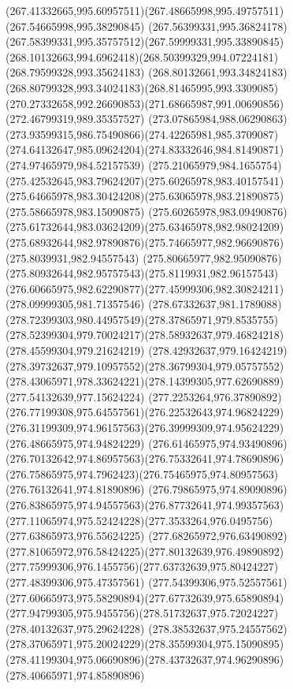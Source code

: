 {{		\curveto(267.41332665,995.60957511)(267.48665998,995.49757511)(267.54665998,995.38290845)
		\curveto(267.56399331,995.36824178)(267.58399331,995.35757512)(267.59999331,995.33890845)
		\curveto(268.10132663,994.6962418)(268.50399329,994.07224181)(268.79599328,993.35624183)
		\curveto(268.80132661,993.34824183)(268.80799328,993.34024183)(268.81465995,993.3309085)
		\curveto(270.27332658,992.26690853)(271.68665987,991.00690856)(272.46799319,989.35357527)
		\curveto(273.07865984,988.06290863)(273.93599315,986.75490866)(274.42265981,985.3709087)
		\curveto(274.64132647,985.09624204)(274.83332646,984.81490871)(274.97465979,984.52157539)
		\curveto(275.21065979,984.1655754)(275.42532645,983.79624207)(275.60265978,983.40157541)
		\curveto(275.64665978,983.30424208)(275.63065978,983.21890875)(275.58665978,983.15090875)
		\curveto(275.60265978,983.09490876)(275.61732644,983.03624209)(275.63465978,982.98024209)
		\curveto(275.68932644,982.97890876)(275.74665977,982.96690876)(275.8039931,982.94557543)
		\curveto(275.80665977,982.95090876)(275.80932644,982.95757543)(275.8119931,982.96157543)
		\curveto(276.60665975,982.62290877)(277.45999306,982.30824211)(278.09999305,981.71357546)
		\curveto(278.67332637,981.1789088)(278.72399303,980.44957549)(278.37865971,979.8535755)
		\curveto(278.52399304,979.70024217)(278.58932637,979.46824218)(278.45599304,979.21624219)
		\curveto(278.42932637,979.16424219)(278.39732637,979.10957552)(278.36799304,979.05757552)
		\curveto(278.43065971,978.33624221)(278.14399305,977.62690889)(277.54132639,977.15624224)
		\curveto(277.2253264,976.37890892)(276.77199308,975.64557561)(276.22532643,974.96824229)
		\curveto(276.31199309,974.96157563)(276.39999309,974.95624229)(276.48665975,974.94824229)
		\curveto(276.61465975,974.93490896)(276.70132642,974.86957563)(276.75332641,974.78690896)
		\curveto(276.75865975,974.7962423)(276.75465975,974.80957563)(276.76132641,974.81890896)
		\curveto(276.79865975,974.89090896)(276.83865975,974.94557563)(276.87732641,974.99357563)
		\curveto(277.11065974,975.52424228)(277.3533264,976.0495756)(277.63865973,976.55624225)
		\curveto(277.68265972,976.63490892)(277.81065972,976.58424225)(277.80132639,976.49890892)
		\curveto(277.75999306,976.1455756)(277.63732639,975.80424227)(277.48399306,975.47357561)
		\curveto(277.54399306,975.52557561)(277.60665973,975.58290894)(277.67732639,975.65890894)
		\curveto(277.94799305,975.9455756)(278.51732637,975.72024227)(278.40132637,975.29624228)
		\curveto(278.38532637,975.24557562)(278.37065971,975.20024229)(278.35599304,975.15090895)
		\curveto(278.41199304,975.06690896)(278.43732637,974.96290896)(278.40665971,974.85890896)
}}
